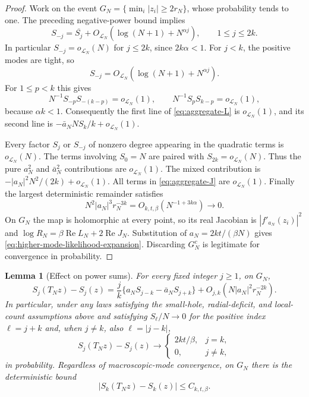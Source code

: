 \documentclass[11pt,a4paper]{article}
\numberwithin{equation}{section}
\newtheorem{lemma}[theorem]{Lemma}
\theoremstyle{definition}
\theoremstyle{remark}
\begin{document}
\begin{proof}
Work on the event $G_N=\{\min_i|z_i|\geq2r_N\}$, whose probability
tends to one. The preceding negative-power bound implies
\[
 S_{-j}=\overline{S_j}
       +O_{\mathcal L_N}(\log(N+1)+N^{\alpha j}),\qquad 1\leq j\leq2k.
\]
In particular $S_{-j}=o_{\mathcal L_N}(N)$ for $j\leq2k$, since
$2k\alpha<1$. For $j<k$, the positive modes are tight, so
\[
 S_{-j}=O_{\mathcal L_N}(\log(N+1)+N^{\alpha j}).
\]
For $1\leq p<k$ this gives
\[
 N^{-1}S_{-p}S_{-(k-p)}=o_{\mathcal L_N}(1),
 \qquad N^{-1}S_pS_{k-p}=o_{\mathcal L_N}(1),
\]
because $\alpha k<1$. Consequently the first line of
\eqref{eq:aggregate-L} is $o_{\mathcal L_N}(1)$, and its second line
is $-\bar a_N N S_k/k+o_{\mathcal L_N}(1)$.

Every factor $S_j$ or $S_{-j}$ of nonzero degree appearing in the
quadratic terms is $o_{\mathcal L_N}(N)$. The terms involving $S_0=N$
are paired with $S_{2k}=o_{\mathcal L_N}(N)$. Thus the pure $a_N^2$
and $\bar a_N^2$ contributions are $o_{\mathcal L_N}(1)$.
The mixed contribution is
$-|a_N|^2N^2/(2k)+o_{\mathcal L_N}(1)$.
All terms in \eqref{eq:aggregate-J} are $o_{\mathcal L_N}(1)$.
Finally the largest deterministic remainder satisfies
\[
 N^2|a_N|^3r_N^{-3k}=O_{k,t,\beta}(N^{-1+3k\alpha})\longrightarrow0.
\]
On $G_N$ the map is holomorphic at every point, so its real Jacobian
is $|f'_{a_N}(z_i)|^2$ and
$\log R_N=\beta\operatorname{Re}L_N+2\operatorname{Re}J_N$.
Substitution of $a_N=2kt/(\beta N)$ gives
\eqref{eq:higher-mode-likelihood-expansion}. Discarding $G_N^c$ is
legitimate for convergence in probability.
\end{proof}

\begin{lemma}[Effect on power sums]
\label{lem:transport-mode-shifts}
For every fixed integer $j\geq1$, on $G_N$,
\begin{equation}
 S_j(T_Nz)-S_j(z)
 =\frac{j}{k}\{a_NS_{j-k}-\bar a_NS_{j+k}\}
       +O_{j,k}(N|a_N|^2r_N^{-2k}).
 \label{eq:mode-shift-expansion}
\end{equation}
In particular, under any laws satisfying the small-hole, radial-deficit,
and local-count assumptions above and satisfying $S_\ell/N\to0$ for
the positive index $\ell=j+k$ and, when $j\ne k$, also
$\ell=|j-k|$,
\[
 S_j(T_Nz)-S_j(z)\longrightarrow
 \begin{cases}2kt/\beta,&j=k,\\0,&j\ne k,\end{cases}
\]
in probability. Regardless of macroscopic-mode convergence, on $G_N$
there is the deterministic bound
\begin{equation}
 |S_k(T_Nz)-S_k(z)|\leq C_{k,t,\beta}.
 \label{eq:k-shift-uniform-bound}
\end{equation}
\end{lemma}
\end{document}

